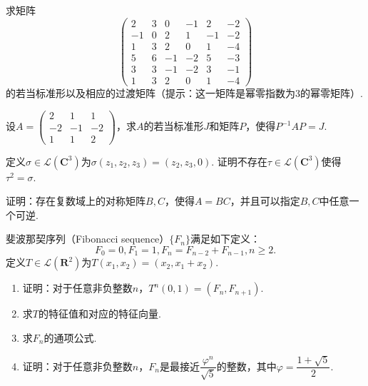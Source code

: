 \begin{exercise}

    \begin{exgroup}
        \item
    \end{exgroup}

    \begin{exgroup}
        \item 求矩阵\[\begin{pmatrix}
                2 & 3 & 0  & -1 & 2 & -2 \\ -1 & 0 & 2 & 1 & -1 & -2 \\
                1 & 3 & 2  & 0  & 1 & -4 \\ 5 & 6 & -1 & -2 & 5 & -3 \\
                3 & 3 & -1 & -2 & 3 & -1 \\ 1 & 3 & 2 & 0 & 1 & -4
            \end{pmatrix}\]的若当标准形以及相应的过渡矩阵（提示：这一矩阵是幂零指数为3的幂零矩阵）.

        \item 设$A=\begin{pmatrix}
                2 & 1 & 1 \\ -2 & -1 & -2 \\ 1 & 1 & 2
            \end{pmatrix}$，求$A$的若当标准形$J$和矩阵$P$，使得$P^{-1}AP=J$.

        \item 定义$\sigma\in \mathcal{L}(\mathbf{C}^3)$为$\sigma(z_1,z_2,z_3)=(z_2,z_3,0)$. 证明不存在$\tau\in \mathcal{L}(\mathbf{C}^3)$使得$\tau^2=\sigma$.

        \item 证明：存在复数域上的对称矩阵$B,C$，使得$A=BC$，并且可以指定$B,C$中任意一个可逆.

        \item 斐波那契序列（Fibonacci sequence）$\{F_n\}$满足如下定义：
        \[
            F_0 = 0, F_1 = 1, F_n = F_{n - 2} + F_{n - 1}, n \geqslant 2.
        \]
        定义$T \in \mathcal{L}(\mathbf{R}^2)$为$T(x_1, x_2) = (x_2, x_1 + x_2)$.
        \begin{enumerate}
            \item 证明：对于任意非负整数$n$，$T^n(0, 1) = (F_n, F_{n + 1})$.
            \item 求$T$的特征值和对应的特征向量.
            \item 求$F_n$的通项公式.
            \item 证明：对于任意非负整数$n$，$F_n$是最接近$\dfrac{\varphi^n}{\sqrt{5}}$的整数，其中$\varphi = \dfrac{1 + \sqrt{5}}{2}$.
        \end{enumerate}
    \end{exgroup}

    \begin{exgroup}
        \item
    \end{exgroup}
\end{exercise}
